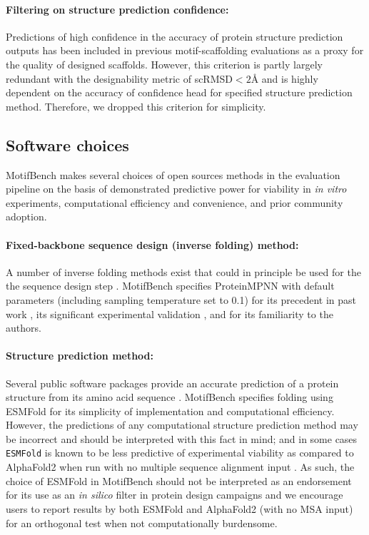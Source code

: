 \paragraph{Filtering on structure prediction confidence:}
Predictions of high confidence in the accuracy of protein structure prediction outputs has been included in previous motif-scaffolding evaluations as a proxy for the quality of designed scaffolds.
However, this criterion is partly largely redundant with the designability metric of scRMSD$<2${\AA} and is highly dependent on the accuracy of confidence head for specified structure prediction method.
Therefore, we dropped this criterion for simplicity.

\subsection*{Software choices}
MotifBench makes several choices of open sources methods in the evaluation pipeline on the basis of 
demonstrated predictive power for viability in \emph{in vitro} experiments,
computational efficiency and convenience,
and prior community adoption.

\paragraph{Fixed-backbone sequence design (inverse folding) method:}
A number of inverse folding methods exist that could in principle be used for the the sequence design step \citep[e.g.][]{dauparas2022robust,liu2022rotamer,anand2022protein}.
MotifBench specifies ProteinMPNN \citep{dauparas2022robust} with default parameters (including sampling temperature set to 0.1) for its precedent in past work \citep[e.g.][]{trippe2022diffusion}, its significant experimental validation \citep{dauparas2022robust,watson2022broadly}, and for its familiarity to the authors.

\paragraph{Structure prediction method:}
Several public software packages provide an accurate prediction of a protein structure from its amino acid sequence \citep{baek2021accurate,jumper2021highly,lin2022language,wu2022omegafold}. 
MotifBench specifies folding using ESMFold \citep{lin2022language} for its simplicity of implementation and computational efficiency.
However, the predictions of any computational structure prediction method may be incorrect and should be interpreted with this fact in mind;
and in some cases \texttt{ESMFold} is known to be less predictive of experimental viability as compared to AlphaFold2 \citep{jumper2021highly} when run with no multiple sequence alignment input \citep{martin2023validation}.
As such, the choice of ESMFold in MotifBench should not be interpreted as an endorsement for its use as an \emph{in silico} filter in protein design campaigns and we encourage users to report results by both ESMFold and AlphaFold2 (with no MSA input) for an orthogonal test when not computationally burdensome.

